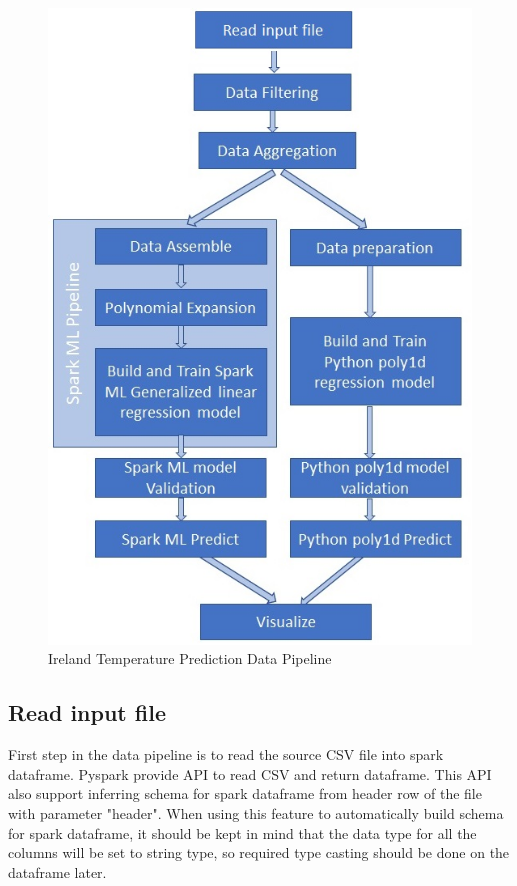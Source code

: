 \documentclass[journal,twoside,web]{ieeecolor}
\begin{document}
\begin{figure}[h]
\centering
\captionsetup{justification=centering}
\includegraphics[scale=.55]{Ireland_Temperature_Prediction_Data_Pipeline.jpg}
\caption{Ireland Temperature Prediction Data Pipeline}
\label{ITPDPL}
\end{figure}

\subsection{Read input file}
First step in the data pipeline is to read the source CSV file into spark dataframe.  Pyspark provide API to read CSV and return dataframe.  This API also support inferring schema for spark dataframe from header row of the file with parameter "header". When using this feature to automatically build schema for spark dataframe, it should be kept in mind that the data type for all the columns will be set to string type, so required type casting should be done on the dataframe later.
\end{document}
